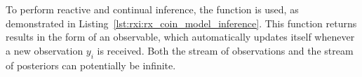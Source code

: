 To perform reactive and continual inference, the  function is used, as
demonstrated in Listing~\ref{lst:rxi:rx_coin_model_inference}.
This function returns results in the form of an observable, which automatically updates itself
whenever a new observation $y_i$ is received.
Both the stream of observations and the stream of posteriors can potentially be infinite.
\begin{figure*}[h!]
  \begin{adjustbox}{minipage=\textwidth,margin=0pt \smallskipamount,center}
  \end{adjustbox}
\end{figure*}

